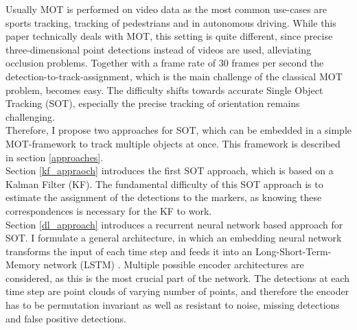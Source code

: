 \documentclass[12pt,a4paper]{article}
\begin{document}
Usually MOT is performed on video data as the most common use-cases are sports tracking, tracking of pedestrians and in autonomous driving. While this paper technically deals with MOT, this setting is quite different, since precise three-dimensional point detections instead of videos are used, alleviating occlusion problems. Together with a frame rate of 30 frames per second the detection-to-track-assignment, which is the main challenge of the classical MOT problem, becomes easy. The difficulty shifts towards accurate Single Object Tracking (SOT), especially the precise tracking of orientation remains challenging. 
\\
Therefore, I propose two approaches for SOT, which can be embedded in a simple MOT-framework to track multiple objects at once. This framework is described in section \ref{approaches}. \\
Section \ref{kf_appraoch} introduces the first SOT approach, which is based on a Kalman Filter (KF). The fundamental difficulty of this SOT approach is to estimate the assignment of the detections to the markers, as knowing these correspondences is necessary for the KF to work.
\\
Section \ref{dl_approach} introduces a recurrent neural network based approach for SOT. I formulate a general architecture, in which an embedding neural network transforms the input of each time step and feeds it into an Long-Short-Term-Memory  network (LSTM) \cite{LSTM}. Multiple possible encoder architectures are considered, as this is the most crucial part of the network. The detections at each time step are point clouds of varying number of points, and therefore the encoder has to be permutation invariant as well as resistant to noise, missing detections and false positive detections.\\
\end{document}
